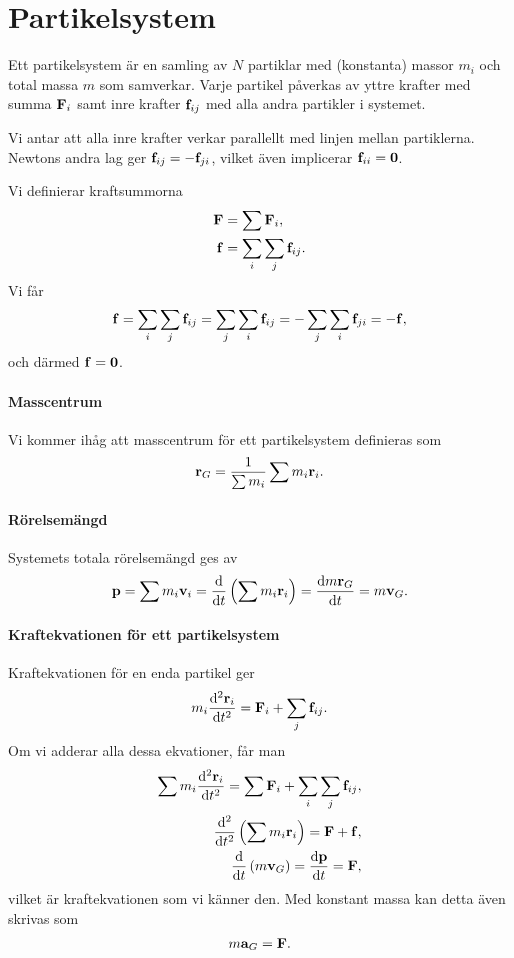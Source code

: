 \section{Partikelsystem}
Ett partikelsystem är en samling av $N$ partiklar med (konstanta) massor $m_i$ och total massa $m$ som samverkar. Varje partikel påverkas av yttre krafter med summa $\vb{F}_{i}$ samt inre krafter $\vb{f}_{ij}$ med alla andra partikler i systemet.

Vi antar att alla inre krafter verkar parallellt med linjen mellan partiklerna. Newtons andra lag ger $\vb{f}_{ij} = -\vb{f}_{ji}$, vilket även implicerar $\vb{f}_{ii}= \vb{0}$.

Vi definierar kraftsummorna
\begin{align*}
	\vb{F}     &= \sum \vb{F}_{i}, \\
	\vb{f}     &= \sum\limits_{i}\sum\limits_{j}\vb{f}_{ij}.
\end{align*}
Vi får
\begin{align*}
	\vb{f} = \sum\limits_{i}\sum\limits_{j}\vb{f}_{ij} = \sum\limits_{j}\sum\limits_{i}\vb{f}_{ij} = -\sum\limits_{j}\sum\limits_{i}\vb{f}_{ji} = -\vb{f},
\end{align*}
och därmed $\vb{f} = \vb{0}$.

\paragraph{Masscentrum}
Vi kommer ihåg att masscentrum för ett partikelsystem definieras som
\begin{align*}
	\vb{r}_{G} = \frac{1}{\sum m_i}\sum m_i\vb{r}_i.
\end{align*}

\paragraph{Rörelsemängd}
Systemets totala rörelsemängd ges av
\begin{align*}
	\vb{p} = \sum m_i\vb{v}_{i} = \dv{t}\left(\sum m_i\vb{r}_{i}\right) = \dv{m\vb{r}_{G}}{t} = m\vb{v}_{G}.
\end{align*}

\paragraph{Kraftekvationen för ett partikelsystem}
Kraftekvationen för en enda partikel ger
\begin{align*}
	m_{i}\dv[2]{\vb{r}_{i}}{t} = \vb{F}_{i} + \sum\limits_{j}\vb{f}_{ij}.
\end{align*}
Om vi adderar alla dessa ekvationer, får man
\begin{align*}
	\sum m_{i}\dv[2]{\vb{r}_{i}}{t} = \sum \vb{F}_{i} + \sum\limits_{i}\sum\limits_{j}\vb{f}_{ij}, \\
	\dv[2]{t}\left(\sum m_{i}\vb{r}_{i}\right) = \vb{F} + \vb{f}, \\
	\dv{t}\left(m\vb{v}_{G}\right) = \dv{\vb{p}}{t} = \vb{F},
\end{align*}
vilket är kraftekvationen som vi känner den. Med konstant massa kan detta även skrivas som
\begin{align*}
	m\vb{a}_{G} = \vb{F}.
\end{align*}

